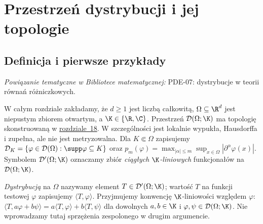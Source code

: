 \setcounter{section}{18}
\section{Przestrzeń dystrybucji i jej topologie}
\label{sec:dystrybucje19}

\providecommand{\atlasref}[2]{#2}


\subsection{Definicja i pierwsze przykłady}

\noindent\emph{Powiązanie tematyczne w Bibliotece matematycznej:} \atlasref{PDE-07::def:pde7-distribution}{PDE-07: dystrybucje w teorii równań różniczkowych}.


W całym rozdziale zakładamy, że $d\ge1$ jest liczbą całkowitą,
$\Omega\subseteq\R^d$ jest niepustym zbiorem otwartym,
a $\K\in\{\R,\C\}$.
Przestrzeń $\mathcal D(\Omega;\K)$ ma topologię skonstruowaną
w \hyperref[sec:funkcje-testowe18]{rozdziale~18}. W szczególności
jest lokalnie wypukła, Hausdorffa i zupełna, ale nie jest
metryzowalna. Dla $K\Subset\Omega$ zapisujemy
$\mathcal D_K=\{\varphi\in\mathcal D(\Omega):\supp\varphi\subseteq K\}$
oraz $p_m(\varphi)=\max_{|\alpha|\le m}\sup_{x\in\Omega}
|\partial^\alpha\varphi(x)|$. Symbolem $\mathcal D'(\Omega;\K)$
oznaczamy zbiór \emph{ciągłych $\K$-liniowych} funkcjonałów
na $\mathcal D(\Omega;\K)$.

\begin{definicja}[Dystrybucja]
\label{def:distribution19}
\emph{Dystrybucją} na $\Omega$ nazywamy element
$T\in\mathcal D'(\Omega;\K)$; wartość $T$ na funkcji
testowej $\varphi$ zapisujemy $\langle T,\varphi\rangle$.
Przyjmujemy konwencję $\K$-liniowości względem $\varphi$:
$\langle T,a\varphi+b\psi\rangle=a\langle T,\varphi\rangle+
b\langle T,\psi\rangle$ dla dowolnych $a,b\in\K$
i $\varphi,\psi\in\mathcal D(\Omega;\K)$.
Nie wprowadzamy tutaj sprzężenia
zespolonego w drugim argumencie.
\end{definicja}

